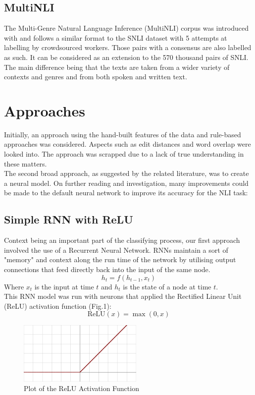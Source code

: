 \documentclass[12pt, conference]{IEEEtran}
\begin{document}
\subsection{MultiNLI}
The Multi-Genre Natural Language Inference (MultiNLI) corpus was introduced with \cite{b3} and follows a similar format to the SNLI dataset with 5 attempts at labelling by crowdsourced workers. Those pairs with a consensus are also labelled as such. It can be considered as an extension to the 570 thousand pairs of SNLI. The main difference being that the texts are taken from a wider variety of contexts and genres and from both spoken and written text.  

\section{Approaches}
Initially, an approach using the hand-built features of the data and rule-based approaches was considered. Aspects such as edit distances and word overlap were looked into. The approach was scrapped due to a lack of true understanding in these matters.\\
The second broad approach, as suggested by the related literature, was to create a neural model. On further reading and investigation, many improvements could be made to the default neural network to improve its accuracy for the NLI task:

\subsection{Simple RNN with ReLU}
Context being an important part of the classifying process, our first approach involved the use of a Recurrent Neural Network. RNNs maintain a sort of "memory" and context along the run time of the network by utilising output connections that feed directly back into the input of the same node. 
$$
h_t = f(h_{t-1}, x_t)
$$
Where $x_t$ is the input at time $t$ and $h_t$ is the state of a node at time $t$. \\
This RNN model was run with neurons that applied the Rectified Linear Unit (ReLU) activation function (Fig.1):
$$
\text{ReLU}(x)=\max(0,x)
$$
\begin{figure}[h]
\centering
\includegraphics[width=6cm]{images/relu.png}
\caption{Plot of the ReLU Activation Function}
\end{figure}
\end{document}
